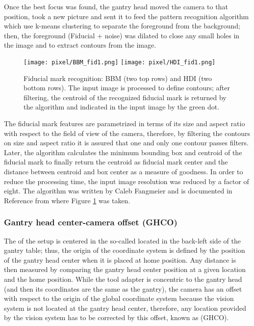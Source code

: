 Once the best focus was found, the gantry head moved the camera to that position, took a new picture and sent it to feed the pattern recognition algorithm which use k-means clustering to separate the foreground from the background; then, the foreground (Fiducial + noise) was dilated to close any small holes in the image and to extract contours from the image.

\begin{figure}[!ht]
  \centering  
  \texttt{[image: pixel/BBM\_fid1.png]}
  \texttt{[image: pixel/HDI\_fid1.png]}
  \caption[Fiducial mark recognition.]{Fiducial mark recognition: BBM (two top rows) and HDI (two bottom rows). The input image is processed to define contours; after filtering, the centroid of the recognized fiducial mark is returned by the algorithm and indicated in the input image by the green dot.}\label{fig:BBM_fid1}
\end{figure}

The fiducial mark features are parametrized in terms of its size and aspect ratio with respect to the field of view of the camera, therefore, by filtering the contours on size and aspect ratio it is assured that one and only one contour passes filters. Later, the algorithm calculates the minimum bounding box and centroid of the fiducial mark to finally return the centroid as fiducial mark center and the distance between centroid and box center as a measure of goodness. In order to reduce the processing time, the input image resolution was reduced by a factor of eight. The algorithm was written by Caleb Fangmeier and is documented in Reference \cite{pr_algorithm} from where Figure \ref{fig:BBM_fid1} was taken.

\subsubsection*{Gantry head center-camera offset (GHCO)}

The  of the setup is centered in the so-called  located in the back-left side of the gantry table; thus, the origin of the coordinate system is defined by the position of the gantry head center when it is placed at home position. Any distance is then measured by comparing the gantry head center position at a given location and the home position. While the tool adapter is concentric to the gantry head (and then its coordinates are the same as the gantry), the camera has an offset with respect to the origin of the global coordinate system because the vision system is not located at the gantry head center, therefore, any location provided by the vision system has to be corrected by this offset, known as  (GHCO).

